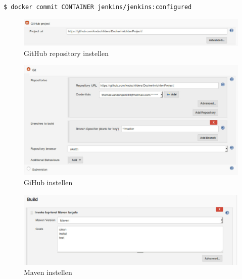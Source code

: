 \documentclass[12pt]{article}
\begin{document}
\begin{lstlisting}[language=Bash]
    $ docker commit CONTAINER jenkins/jenkins:configured
\end{lstlisting}



\begin{figure}[H]
	\begin{center}
		\includegraphics[width=1.0\textwidth]{images/Jenkins-Github.PNG}
		\caption{GitHub repository instellen\label{fig:jenkins_config_repo}}
	\end{center}
\end{figure}

\begin{figure}[H]
	\begin{center}
		\includegraphics[width=1.0\textwidth]{images/Jenkins-Github-2.PNG}
		\caption{GiHub instellen\label{fig:jenkins_config_repo_2}}
	\end{center}
\end{figure}

\begin{figure}[H]
	\begin{center}
		\includegraphics[width=1.0\textwidth]{images/Maven.PNG}
		\caption{Maven instellen\label{fig:jenkins_maven}}
	\end{center}
\end{figure}
\end{document}
